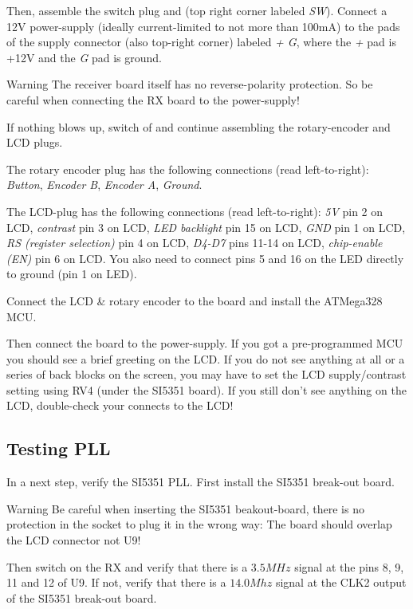 \documentclass[10pt, a4paper]{scrartcl}
\newenvironment{warning}{\begin{bclogo}[couleur=red!30,arrondi=.1,logo=\bcattention,ombre=true]{Warning}}{\end{bclogo}}
\begin{document}
 Then, assemble the switch plug and (top right corner labeled \emph{SW}). Connect a 12V power-supply (ideally current-limited to not more than 100mA) to the pads of the supply connector (also top-right corner) labeled \emph{+ G}, where the \emph{+} pad is +12V and the \emph{G} pad is ground. 

\begin{warning}
 The receiver board itself has no reverse-polarity protection. So be careful when connecting the RX board to the power-supply!
\end{warning}
  
 If nothing blows up, switch of and continue assembling the rotary-encoder and LCD plugs. 
 
 The rotary encoder plug has the following connections (read left-to-right): \emph{Button}, \emph{Encoder B}, \emph{Encoder A}, \emph{Ground}. 

 The LCD-plug has the following connections (read left-to-right): \emph{5V} pin 2 on LCD, \emph{contrast} pin 3 on LCD, \emph{LED backlight} pin 15 on LCD, \emph{GND} pin 1 on LCD, \emph{RS (register selection)} pin 4 on LCD, \emph{D4-D7} pins 11-14 on LCD, \emph{chip-enable (EN)} pin 6 on LCD. You also need to connect pins 5 and 16 on the LED directly to ground (pin 1 on LED).
 
 Connect the LCD \& rotary encoder to the board and install the ATMega328 MCU. 

 Then connect the board to the power-supply. If you got a pre-programmed MCU you should see a brief greeting on the LCD. If you do not see anything at all or a series of back blocks on the screen, you may have to set the LCD supply/contrast setting using RV4 (under the SI5351 board). If you still don't see anything on the LCD, double-check your connects to the LCD! 

\subsection{Testing PLL}
In a next step, verify the SI5351 PLL. First install the SI5351 break-out board. 

\begin{warning}
 Be careful when inserting the SI5351 beakout-board, there is no protection in the socket to plug it in the wrong way: The board should overlap the LCD connector not U9!
\end{warning}
 
Then switch on the RX and verify that there is a $3.5MHz$ signal at the pins 8, 9, 11 and 12 of U9. If not, verify that there is a $14.0Mhz$ signal at the CLK2 output of the SI5351 break-out board. 
\end{document}
